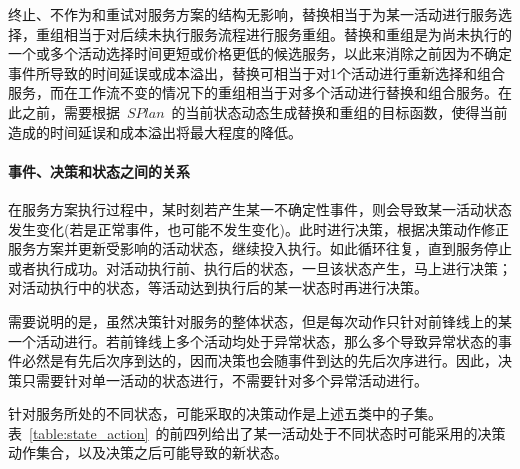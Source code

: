 终止、不作为和重试对服务方案的结构无影响，替换相当于为某一活动进行服务选择，重组相当于对后续未执行服务流程进行服务重组。替换和重组是为尚未执行的一个或多个活动选择时间更短或价格更低的候选服务，以此来消除之前因为不确定事件所导致的时间延误或成本溢出，替换可相当于对1个活动进行重新选择和组合服务，而在工作流不变的情况下的重组相当于对多个活动进行替换和组合服务。在此之前，需要根据~$SPlan$~的当前状态动态生成替换和重组的目标函数，使得当前造成的时间延误和成本溢出将最大程度的降低。

\paragraph{事件、决策和状态之间的关系}

在服务方案执行过程中，某时刻若产生某一不确定性事件，则会导致某一活动状态发生变化(若是正常事件，也可能不发生变化)。此时进行决策，根据决策动作修正服务方案并更新受影响的活动状态，继续投入执行。如此循环往复，直到服务停止或者执行成功。对活动执行前、执行后的状态，一旦该状态产生，马上进行决策；对活动执行中的状态，等活动达到执行后的某一状态时再进行决策。

需要说明的是，虽然决策针对服务的整体状态，但是每次动作只针对前锋线上的某一个活动进行。若前锋线上多个活动均处于异常状态，那么多个导致异常状态的事件必然是有先后次序到达的，因而决策也会随事件到达的先后次序进行。因此，决策只需要针对单一活动的状态进行，不需要针对多个异常活动进行。

针对服务所处的不同状态，可能采取的决策动作是上述五类中的子集。表~\ref{table:state_action}~的前四列给出了某一活动处于不同状态时可能采用的决策动作集合，以及决策之后可能导致的新状态。

